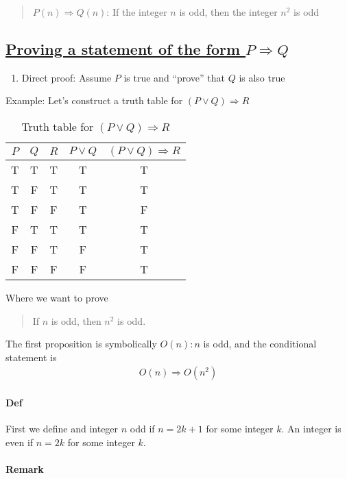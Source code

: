 \documentclass[../main.tex]{subfiles}
\begin{document}
\begin{quote}
    $P(n) \Rightarrow Q(n)$: If the integer $n$ is odd, then the integer $n^2$ is odd
\end{quote}

\subsection*{\underline{Proving a statement of the form $P \Rightarrow Q$}}

\begin{enumerate}
    \item Direct proof: Assume $P$ is true and ``prove'' that $Q$ is also true
\end{enumerate}


\newpage
{}

Example: Let's construct a truth table for $(P \lor Q) \Rightarrow R$
\begin{table}[ht]
    \centering
    \begin{tabular}{c|c|c|c|c}
        $P$ & $Q$ & $R$ & $P \lor Q$ & $(P \lor Q) \Rightarrow R$ \\
        \hline
        T & T & T & T & T \\
        T & F & T & T & T \\
        T & F & F & T & F \\
        F & T & T & T & T \\
        F & F & T & F & T \\
        F & F & F & F & T
    \end{tabular}
    \caption{Truth table for $(P \lor Q) \Rightarrow R$}
\end{table}

Where we want to prove
\begin{quote}
    If $n$ is odd, then $n^2$ is odd.
\end{quote}
The first proposition is symbolically $O(n): n$ is odd, and the conditional statement is
\begin{align*}
    O(n) \Rightarrow O(n^2)
\end{align*}
\paragraph{Def}

First we define and integer $n$ odd if $n = 2k + 1$ for some integer $k$. An integer is even if
$n = 2k$ for some integer $k$. 

\paragraph{Remark}
\end{document}
